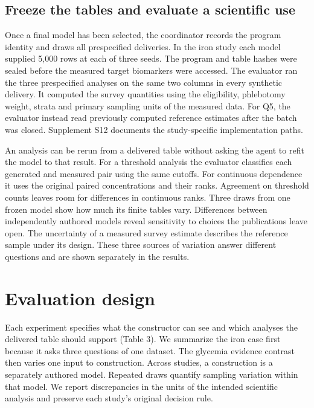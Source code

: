 \documentclass[11pt,letterpaper]{article}
\begin{document}
\subsection{Freeze the tables and evaluate a scientific use}

Once a final model has been selected, the coordinator records the program identity and draws all prespecified deliveries. In the iron study each model supplied 5,000 rows at each of three seeds. The program and table hashes were sealed before the measured target biomarkers were accessed. The evaluator ran the three prespecified analyses on the same two columns in every synthetic delivery. It computed the survey quantities using the eligibility, phlebotomy weight, strata and primary sampling units of the measured data. For Q5, the evaluator instead read previously computed reference estimates after the batch was closed. Supplement S12 documents the study-specific implementation paths.


An analysis can be rerun from a delivered table without asking the agent to refit the model to that result. For a threshold analysis the evaluator classifies each generated and measured pair using the same cutoffs. For continuous dependence it uses the original paired concentrations and their ranks. Agreement on threshold counts leaves room for differences in continuous ranks. Three draws from one frozen model show how much its finite tables vary. Differences between independently authored models reveal sensitivity to choices the publications leave open. The uncertainty of a measured survey estimate describes the reference sample under its design. These three sources of variation answer different questions and are shown separately in the results.


\section{Evaluation design}

Each experiment specifies what the constructor can see and which analyses the delivered table should support (Table 3). We summarize the iron case first because it asks three questions of one dataset. The glycemia evidence contrast then varies one input to construction. Across studies, a construction is a separately authored model. Repeated draws quantify sampling variation within that model. We report discrepancies in the units of the intended scientific analysis and preserve each study's original decision rule.


\begingroup
\end{document}
